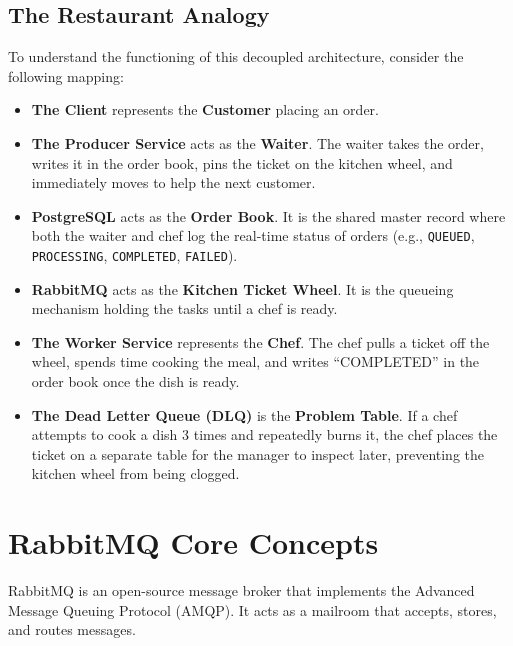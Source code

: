 \documentclass[11pt,a4paper]{article}
\begin{document}
\subsection{The Restaurant Analogy}
To understand the functioning of this decoupled architecture, consider the following mapping:
\begin{itemize}
    \item \textbf{The Client} represents the \textbf{Customer} placing an order.
    \item \textbf{The Producer Service} acts as the \textbf{Waiter}. The waiter takes the order, writes it in the order book, pins the ticket on the kitchen wheel, and immediately moves to help the next customer.
    \item \textbf{PostgreSQL} acts as the \textbf{Order Book}. It is the shared master record where both the waiter and chef log the real-time status of orders (e.g., \texttt{QUEUED}, \texttt{PROCESSING}, \texttt{COMPLETED}, \texttt{FAILED}).
    \item \textbf{RabbitMQ} acts as the \textbf{Kitchen Ticket Wheel}. It is the queueing mechanism holding the tasks until a chef is ready.
    \item \textbf{The Worker Service} represents the \textbf{Chef}. The chef pulls a ticket off the wheel, spends time cooking the meal, and writes ``COMPLETED'' in the order book once the dish is ready.
    \item \textbf{The Dead Letter Queue (DLQ)} is the \textbf{Problem Table}. If a chef attempts to cook a dish 3 times and repeatedly burns it, the chef places the ticket on a separate table for the manager to inspect later, preventing the kitchen wheel from being clogged.
\end{itemize}

\newpage
\section{RabbitMQ Core Concepts}

RabbitMQ is an open-source message broker that implements the Advanced Message Queuing Protocol (AMQP). It acts as a mailroom that accepts, stores, and routes messages.
\end{document}
